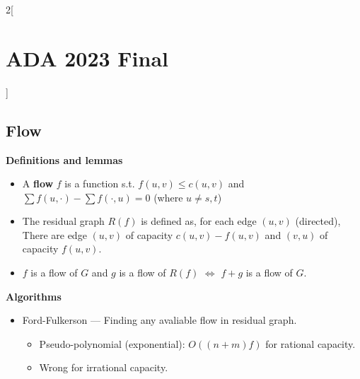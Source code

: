 \documentclass[10pt,a4paper]{report}
\begin{document}
\begin{multicols}{2}[\section*{ADA 2023 Final}]
\subsection*{Flow}
  \textbf{Definitions and lemmas}
    \begin{itemize}
      \item A \textbf{flow} $f$ is a function s.t. $f(u, v) \leq c(u, v)$ and $\sum f(u, \cdot) - \sum f(\cdot, u) = 0$ (where $u \neq s, t$)
      \item The residual graph $R(f)$ is defined as, for each edge $(u, v)$ (directed),  \\
            There are edge $(u, v)$ of capacity $c(u, v) - f(u, v)$ and $(v, u)$ of capacity $f(u, v)$.       \vspace{-0.65em}
      \item $f$ is a flow of $G$ and $g$ is a flow of $R(f)$ $\Longleftrightarrow$ $f + g$ is a flow of $G$. 
    \end{itemize}

\textbf{Algorithms}
  \begin{itemize}
    \item Ford-Fulkerson --- Finding any avaliable flow in residual graph.
    \begin{itemize}
      \item Pseudo-polynomial (exponential): $O((n + m)f)$ for rational capacity.      
      \item Wrong for irrational capacity.\\        
      

\end{itemize}
\end{itemize}
\end{multicols}
\end{document}
